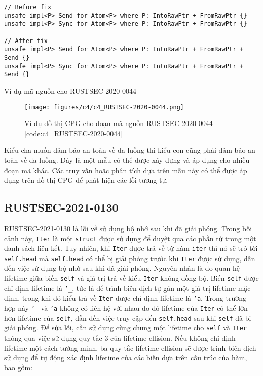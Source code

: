 \begin{listing}[H]
\begin{verbatim}
// Before fix
unsafe impl<P> Send for Atom<P> where P: IntoRawPtr + FromRawPtr {}
unsafe impl<P> Sync for Atom<P> where P: IntoRawPtr + FromRawPtr {}

// After fix
unsafe impl<P> Send for Atom<P> where P: IntoRawPtr + FromRawPtr + Send {}
unsafe impl<P> Sync for Atom<P> where P: IntoRawPtr + FromRawPtr + Send {}
\end{verbatim}
\caption{Ví dụ mã nguồn cho RUSTSEC-2020-0044}
\label{code:c4_RUSTSEC-2020-0044}
\end{listing}

\begin{figure}[H]
    \texttt{[image: figures/c4/c4\_RUSTSEC-2020-0044.png]}
    \centering
    \caption{Ví dụ đồ thị CPG cho đoạn mã nguồn RUSTSEC-2020-0044 \ref{code:c4_RUSTSEC-2020-0044}}
    \label{img:c4_RUSTSEC-2020-0044}
\end{figure}

Kiểu cha muốn đảm bảo an toàn về đa luồng thì kiểu con cũng phải đảm bảo an toàn về đa luồng.
Đây là một mẫu có thể được xây dựng và áp dụng cho nhiều đoạn mã khác.
Các truy vấn hoặc phân tích dựa trên mẫu này có thể được áp dụng trên đồ thị CPG để phát hiện các lỗi tương tự.

\subsection{RUSTSEC-2021-0130}

RUSTSEC-2021-0130 là lỗi về sử dụng bộ nhớ sau khi đã giải phóng.
Trong bối cảnh này, \texttt{Iter} là một \texttt{struct} được sử dụng để duyệt qua các phần tử trong một danh sách liên kết.
Tuy nhiên, khi \texttt{Iter} được trả về từ hàm \texttt{iter} thì nó sẽ trỏ tới \texttt{self.head} mà \texttt{self.head} có thể bị giải phóng trước khi \texttt{Iter} được sử dụng, dẫn đến việc sử dụng bộ nhớ sau khi đã giải phóng.
Nguyên nhân là do quan hệ lifetime giữa biến \texttt{self} và giá trị trả về kiểu \texttt{Iter} không đồng bộ.
Biến \texttt{self} được chỉ định lifetime là \texttt{'\_}, tức là để trình biên dịch tự gán một giá trị lifetime mặc định, trong khi đó kiểu trả về \texttt{Iter} được chỉ định lifetime là \texttt{'a}.
Trong trường hợp này \texttt{'\_} và \texttt{'a} không có liên hệ với nhau do đó lifetime của \texttt{Iter} có thể lớn hơn lifetime của \texttt{self}, dẫn đến việc truy cập đến \texttt{self.head} sau khi \texttt{self} đã bị giải phóng.
Để sửa lỗi, cần sử dụng cùng chung một lifetime cho \texttt{self} và \texttt{Iter} thông qua việc sử dụng quy tắc 3 của lifetime ellision.
Nếu không chỉ định lifetime một cách tường minh, ba quy tắc lifetime ellision sẽ được trình biên dịch sử dụng để tự động xác định lifetime của các biến dựa trên cấu trúc của hàm, bao gồm:


